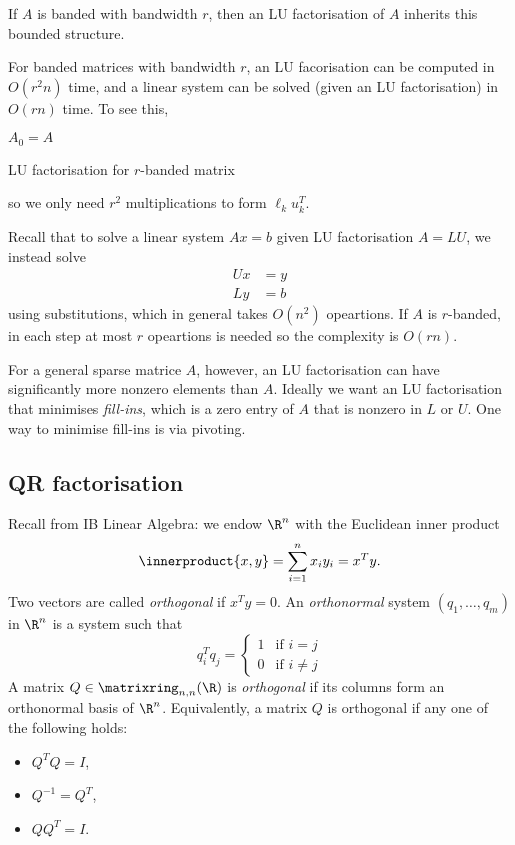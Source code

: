 \documentclass[a4paper]{article}
\newcommand*{\inner}{\innerproduct}
\begin{document}
\begin{application}
  If \(A\) is banded with bandwidth \(r\), then an LU factorisation of \(A\) inherits this bounded structure.
\end{application}

For banded matrices with bandwidth \(r\), an LU facorisation can be computed in \(O(r^2n)\) time, and a linear system can be solved (given an LU factorisation) in \(O(rn)\) time. To see this,

\begin{algorithm}
  \(A_0 = A\)\;
  \caption{LU factorisation for \(r\)-banded matrix}
\end{algorithm}
so we only need \(r^2\) multiplications to form \(\ell_ku_k^T\).

Recall that to solve a linear system \(Ax = b\) given LU factorisation \(A = LU\), we instead solve
\begin{align*}
  Ux &= y \\
  Ly &= b
\end{align*}
using substitutions, which in general takes \(O(n^2)\) opeartions. If \(A\) is \(r\)-banded, in each step at most \(r\) opeartions is needed so the complexity is \(O(rn)\).

For a general sparse matrice \(A\), however, an LU factorisation can have significantly more nonzero elements than \(A\). Ideally we want an LU factorisation that minimises \emph{fill-ins}, which is a zero entry of \(A\) that is nonzero in \(L\) or \(U\). One way to minimise fill-ins is via pivoting.

\subsection{QR factorisation}

Recall from IB Linear Algebra: we endow \(\R^n\) with the Euclidean inner product
\[
  \inner{x, y} = \sum_{i = 1}^n x_iy_i = x^Ty.
\]
Two vectors are called \emph{orthogonal} if \(x^Ty = 0\). An \emph{orthonormal} system \((q_1, \dots, q_m)\) in \(\R^n\) is a system such that
\[
  q_i^Tq_j =
  \begin{cases}
    1 & \text{if } i = j \\
    0 & \text{if } i \neq j
  \end{cases}
\]
A matrix \(Q \in \matrixring_{n, n}(\R)\) is \emph{orthogonal} if its columns form an orthonormal basis of \(\R^n\). Equivalently, a matrix \(Q\) is orthogonal if any one of the following holds:
\begin{itemize}
\item \(Q^TQ = I\),
\item \(Q^{-1} = Q^T\),
\item \(QQ^T = I\).
\end{itemize}
\end{document}
